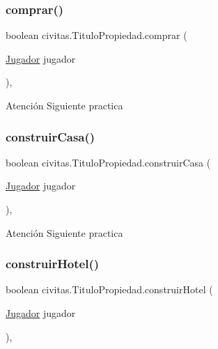 \subsubsection{\texorpdfstring{comprar()}{comprar()}}
{\footnotesize\ttfamily boolean civitas.\+Titulo\+Propiedad.\+comprar (\begin{DoxyParamCaption}\item[{\hyperlink{classcivitas_1_1Jugador}{Jugador}}]{jugador }\end{DoxyParamCaption})\hspace{0.3cm}{\ttfamily [inline]}, {\ttfamily [package]}}

\begin{DoxyWarning}{Atención}
Siguiente practica 
\end{DoxyWarning}
\mbox{\label{classcivitas_1_1TituloPropiedad_a3a335481d7f8cb2c675746d9e87f9b1b}} 
\subsubsection{\texorpdfstring{construir\+Casa()}{construirCasa()}}
{\footnotesize\ttfamily boolean civitas.\+Titulo\+Propiedad.\+construir\+Casa (\begin{DoxyParamCaption}\item[{\hyperlink{classcivitas_1_1Jugador}{Jugador}}]{jugador }\end{DoxyParamCaption})\hspace{0.3cm}{\ttfamily [inline]}, {\ttfamily [package]}}

\begin{DoxyWarning}{Atención}
Siguiente practica 
\end{DoxyWarning}
\mbox{\label{classcivitas_1_1TituloPropiedad_a037ce8da6a29efc2001bb800297b80a5}} 
\subsubsection{\texorpdfstring{construir\+Hotel()}{construirHotel()}}
{\footnotesize\ttfamily boolean civitas.\+Titulo\+Propiedad.\+construir\+Hotel (\begin{DoxyParamCaption}\item[{\hyperlink{classcivitas_1_1Jugador}{Jugador}}]{jugador }\end{DoxyParamCaption})\hspace{0.3cm}{\ttfamily [inline]}, {\ttfamily [package]}}

